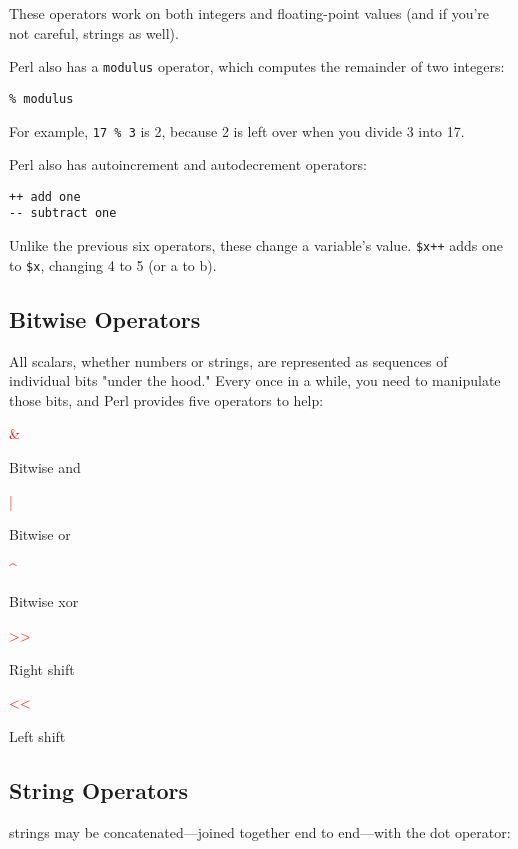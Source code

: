These operators work on both integers and floating-point values (and if you're not careful, strings as well).

Perl also has a \verb|modulus| operator, which computes the remainder of two integers:

\begin{lstlisting}
% modulus
\end{lstlisting}

For example, \verb|17 % 3| is 2, because 2 is left over when you divide 3 into 17.

Perl also has autoincrement and autodecrement operators:

\begin{lstlisting}
++ add one
-- subtract one
\end{lstlisting}

Unlike the previous six operators, these change a variable's value.  \verb|$x++| adds one to \verb|$x|, changing 4 to 5 (or a to b). 

\subsection{Bitwise Operators}
All scalars, whether numbers or strings, are represented as sequences of individual bits "under the hood." Every once in a while, you need to manipulate those bits, and Perl provides five operators to help:

\textcolor{red}{\&}
\begin{adjustwidth}{1cm}{}
Bitwise and
\end{adjustwidth}
\textcolor{red}{|}
\begin{adjustwidth}{1cm}{}
Bitwise or
\end{adjustwidth}
\textcolor{red}{\^{}}
\begin{adjustwidth}{1cm}{}
Bitwise xor
\end{adjustwidth}
\textcolor{red}{\textgreater\textgreater}
\begin{adjustwidth}{1cm}{}
Right shift
\end{adjustwidth}
\textcolor{red}{\textless\textless}
\begin{adjustwidth}{1cm}{}
Left shift
\end{adjustwidth}

\subsection{String Operators}
strings may be concatenated—joined together end to end—with the dot operator:

